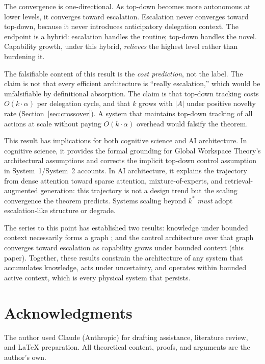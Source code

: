 \documentclass[11pt]{article}
\theoremstyle{definition}
\begin{document}
The convergence is one-directional. As top-down becomes more
autonomous at lower levels, it converges toward escalation.
Escalation never converges toward top-down, because it never
introduces anticipatory delegation context. The endpoint is a hybrid:
escalation handles the routine; top-down handles the novel. Capability
growth, under this hybrid, \emph{relieves} the highest level rather
than burdening it.

The falsifiable content of this result is the \emph{cost prediction},
not the label. The claim is not that every efficient architecture is
``really escalation,'' which would be unfalsifiable by definitional
absorption. The claim is that top-down tracking costs $O(k \cdot
\alpha)$ per delegation cycle, and that $k$ grows with $|A|$ under
positive novelty rate (Section~\ref{sec:crossover}). A system that
maintains top-down tracking of all actions at scale without paying
$O(k \cdot \alpha)$ overhead would falsify the theorem.

This result has implications for both cognitive science and AI
architecture. In cognitive science, it provides the formal grounding
for Global Workspace Theory's architectural assumptions and corrects
the implicit top-down control assumption in System~1/System~2 accounts.
In AI architecture, it explains the trajectory from dense attention
toward sparse attention, mixture-of-experts, and retrieval-augmented
generation: this trajectory is not a design trend but the scaling
convergence the theorem predicts. Systems scaling beyond $k^*$
\emph{must} adopt escalation-like structure or degrade.

The series to this point has established two results: knowledge under
bounded context necessarily forms a graph \cite{McCarthy2026a}; and
the control architecture over that graph converges toward escalation
as capability grows under bounded context (this paper). Together,
these results constrain the architecture of any system that
accumulates knowledge, acts under uncertainty, and operates within
bounded active context, which is every physical system that persists.

\section*{Acknowledgments}

The author used Claude (Anthropic) for drafting assistance, literature review, and \LaTeX{} preparation. All theoretical content, proofs, and arguments are the author's own.
\end{document}
